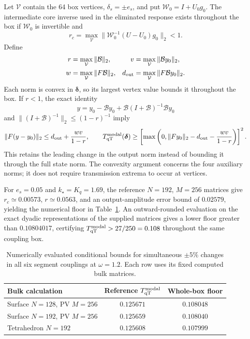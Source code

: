 \documentclass[10pt,aps,pre,onecolumn,notitlepage,nofootinbib]{revtex4-2}
\newcommand{\qT}{\mathrm{qT}}
\begin{document}
Let $\mathcal V$ contain the 64 box vertices, $\delta_s=\pm e_s$, and put $\mathcal W_0=I+U_0g_0$. The intermediate core inverse used in the eliminated response exists throughout the box if $\mathcal W_0$ is invertible and
\begin{equation}
 r_c=\max_{\mathcal V}\|\mathcal W_0^{-1}(U-U_0)g_0\|_2<1.
 \label{eq:sm-box-core}
\end{equation}
Define
\begin{align}
 r&=\max_{\mathcal V}\|\mathcal B\|_2,&
 v&=\max_{\mathcal V}\|\mathcal B y_0\|_2,\\
 w&=\max_{\mathcal V}\|F\mathcal B\|_2,&
 d_{\rm out}&=\max_{\mathcal V}\|F\mathcal B y_0\|_2.
 \label{eq:sm-box-maxima}
\end{align}
Each norm is convex in $\bm\delta$, so its largest vertex value bounds it throughout the box. If $r<1$, the exact identity
\begin{equation}
 y=y_0-\mathcal B y_0+\mathcal B(I+\mathcal B)^{-1}\mathcal B y_0
\end{equation}
and $\|(I+\mathcal B)^{-1}\|_2\leq(1-r)^{-1}$ imply
\begin{equation}
 \|F(y-y_0)\|_2\leq d_{\rm out}+\frac{wv}{1-r},\qquad
 T_{\qT}^{\rm modal}(\bm\delta)\geq
 \left[\max\left(0,\|Fy_0\|_2-d_{\rm out}-\frac{wv}{1-r}\right)\right]^2.
 \label{eq:sm-box-floor}
\end{equation}
This retains the leading change in the output norm instead of bounding it through the full state norm. The convexity argument concerns the four auxiliary norms; it does not require transmission extrema to occur at vertices.

For $e_s=0.05$ and $k_\star=K_q=1.69$, the reference $N=192$, $M=256$ matrices give $r_c\simeq0.00573$, $r\simeq0.0563$, and an output-amplitude error bound of $0.02579$, yielding the numerical floor in Table~\ref{tab:sm-box-floor}. An outward-rounded evaluation on the exact dyadic representations of the supplied matrices gives a lower floor greater than $0.10804017$, certifying $T_{\qT}^{\rm modal}>27/250=0.108$ throughout the same coupling box.

\begin{table}[htbp]
\centering
\caption{Numerically evaluated conditional bounds for simultaneous $\pm5\%$ changes in all six segment couplings at $\omega=1.2$. Each row uses its fixed computed bulk matrices.}
\label{tab:sm-box-floor}
\begin{tabular}{lcc}
\toprule
Bulk calculation & Reference $T_{\qT}^{\rm modal}$ & Whole-box floor\\
\midrule
Surface $N=128$, PV $M=256$ & $0.125671$ & $0.108048$\\
Surface $N=192$, PV $M=256$ & $0.125659$ & $0.108040$\\
Tetrahedron $N=192$ & $0.125608$ & $0.107999$\\
\bottomrule
\end{tabular}
\end{table}
\end{document}
